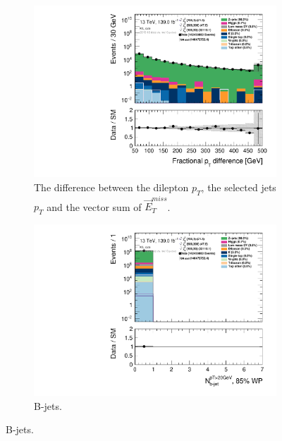 \begin{figure}[H]
\begin{subfigure}[t!]{0.49\textwidth}
        \includegraphics[width=\textwidth]{Figures/SlepSlep/CutAndCount/ML_cuts/hist1d_pTdiff_ML_cuts.pdf}
    \caption{The difference between the dilepton $p_T$, the selected jets $p_T$ and the vector sum of $\Vec{E}_T^{miss}$.}
    \label{fig:my_label}
    \end{subfigure}
    \begin{subfigure}[t!]{0.49\textwidth}
        \includegraphics[width=\textwidth]{Figures/SlepSlep/CutAndCount/ML_cuts/hist1d_nBJet20_MV2c10_FixedCutBEff_85_ML_cuts.pdf}
    \caption{B-jets.}
    \label{fig:my_label}
    \end{subfigure}
\end{figure}

